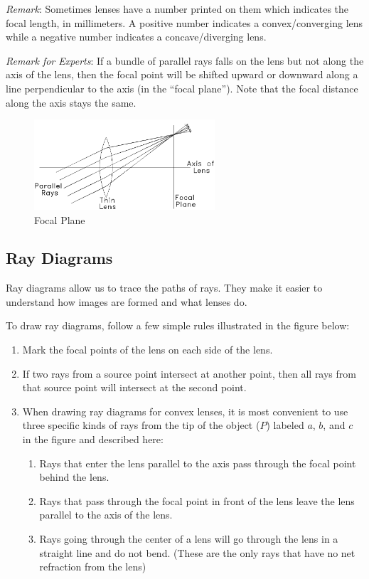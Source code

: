 \emph{Remark}: Sometimes lenses have a number printed on them which indicates the focal length, in millimeters. A positive number indicates a convex/converging lens while a negative number indicates a concave/diverging lens.\myskip

\emph{Remark for Experts}:  If a bundle of parallel rays falls on the lens but not along the axis of the lens, then the focal point will be shifted upward or downward along a line perpendicular to the axis (in the ``focal plane''). Note that the focal distance along the axis stays the same.
\begin{figure}[h]
\centering
\includegraphics[width=0.6\textwidth]{./Exp6/pic/image2.png}
\caption{Focal Plane}
\end{figure} 

\subsection{Ray Diagrams}
Ray diagrams allow us to trace the paths of rays. They make it easier to understand how images are formed and what lenses do. \myskip

To draw ray diagrams, follow a few simple rules illustrated in the figure below:
\begin{enumerate}
\item Mark the focal points of the lens on each side of the lens.
\item If two rays from a source point intersect at another point, then all rays from that source point will intersect at the second point.
\item When drawing ray diagrams for convex lenses, it is most convenient to use three specific kinds of rays from the tip of the object ($P$) labeled $a$, $b$, and $c$ in the figure and described here:
  \begin{enumerate}
  \item Rays that enter the lens parallel to the axis pass through the focal point behind the lens.
  \item Rays that pass through the focal point in front of the lens leave the lens parallel to the axis of the lens.
  \item Rays going through the center of a lens will go through the lens in a straight line and do not bend. (These are the only rays that have no net refraction from the lens)
  \end{enumerate}
\end{enumerate}

